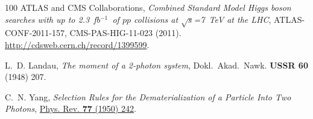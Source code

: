\documentclass[final,3p,times,twocolumn]{elsarticle}
\newcommand{\infb}{fb$^{-1}$}
\begin{document}
\begin{thebibliography}{100}
{ATLAS and CMS Collaborations}, {\em {Combined Standard Model Higgs boson
  searches with up to 2.3~\infb\ of $pp$ collisions at $\sqrt{s}$=7~TeV at the
  LHC}}, ATLAS-CONF-2011-157, CMS-PAS-HIG-11-023 (2011).
  \url{http://cdsweb.cern.ch/record/1399599}.

L.~D. Landau, {\em The moment of a 2-photon system}, Dokl.\ Akad.\ Nawk.
  {\bfseries USSR 60} (1948) 207.

C.~N. Yang, {\em {Selection Rules for the Dematerialization of a Particle Into
  Two Photons}}, \href{http://dx.doi.org/10.1103/PhysRev.77.242}{Phys. Rev.
  {\bfseries 77} (1950) 242}.

\end{thebibliography}\endgroup

\clearpage
\onecolumn

 
\end{document}
